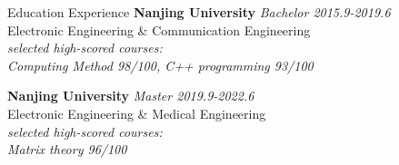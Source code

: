 \documentclass{resume} %
\begin{document}
\begin{rSection}{Education Experience}
    {\bf Nanjing University} \hfill {\em Bachelor 2015.9-2019.6} \\
    Electronic Engineering \& Communication Engineering \\
    {\em selected high-scored courses: \\
    Computing Method 98/100, C++ programming 93/100}

    {\bf Nanjing University} \hfill {\em Master 2019.9-2022.6} \\
    Electronic Engineering \& Medical Engineering \\
    {\em selected high-scored courses: \\
    Matrix theory 96/100}

\end{rSection}
\end{document}
